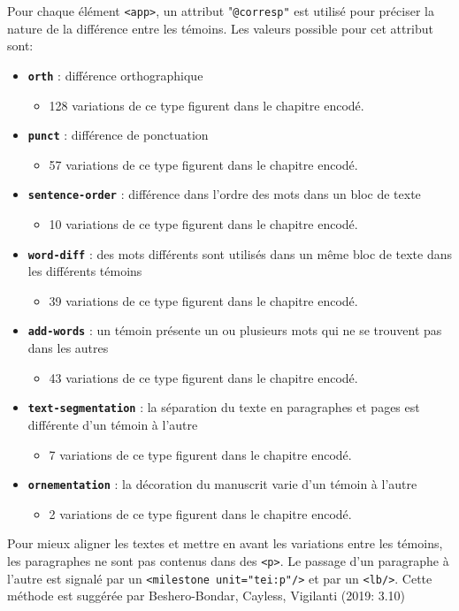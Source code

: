 \documentclass[12pt, a4paper]{article}
\begin{document}
        Pour chaque élément \texttt{<app>}, un attribut "\texttt{@corresp"} est utilisé pour préciser la nature de la différence entre les témoins. Les valeurs possible pour cet attribut sont: \begin{itemize} 
           \item{\textbf{\texttt{orth}} : différence orthographique} \begin{itemize} \item{128 variations de ce type figurent dans le chapitre encodé.} \end{itemize} 
           \item{\textbf{\texttt{punct}} : différence de ponctuation} \begin{itemize} \item{57 variations de ce type figurent dans le chapitre encodé.} \end{itemize} 
           \item{\textbf{\texttt{sentence-order}} : différence dans l'ordre des mots dans un bloc de texte} \begin{itemize} \item{10 variations de ce type figurent dans le chapitre encodé.} \end{itemize} 
           \item{\textbf{\texttt{word-diff}} : des mots différents sont utilisés dans un même bloc de texte dans les différents témoins} \begin{itemize} \item{39 variations de ce type figurent dans le chapitre encodé.} \end{itemize} 
           \item{\textbf{\texttt{add-words}} : un témoin présente un ou plusieurs mots qui ne se trouvent pas dans les autres} \begin{itemize} \item{43 variations de ce type figurent dans le chapitre encodé.} \end{itemize} 
           \item{\textbf{\texttt{text-segmentation}} : la séparation du texte en paragraphes et pages est différente d'un témoin à l'autre} \begin{itemize} \item{7 variations de ce type figurent dans le chapitre encodé.} \end{itemize} 
           \item{\textbf{\texttt{ornementation}} : la décoration du manuscrit varie d'un témoin à l'autre} \begin{itemize} \item{2 variations de ce type figurent dans le chapitre encodé.} \end{itemize} 
         \end{itemize} 
        Pour mieux aligner les textes et mettre en avant les variations entre les témoins, les paragraphes ne sont pas contenus dans des \texttt{<p>}.
            Le passage d'un paragraphe à l'autre est signalé par un \texttt{<milestone unit="tei:p"/>} et par un \texttt{<lb/>}.
            Cette méthode est suggérée par Beshero-Bondar, Cayless, Vigilanti (2019: 3.10)
            
\end{document}

